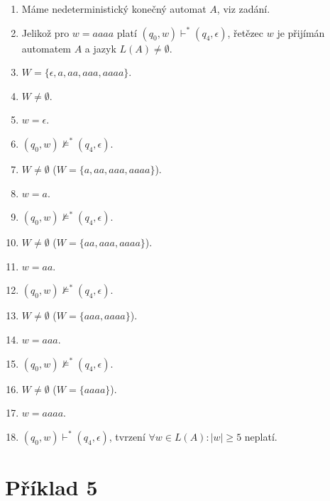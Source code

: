 \documentclass[11pt, a4paper, titlepage]{article}
\begin{document}
\begin{multicols}{2}
    \begin{enumerate}

        \item Máme nedeterministický konečný automat $A$, viz zadání.
        \item Jelikož pro $w=aaaa$ platí $(q_0, w) \vdash^* (q_4, \epsilon)$, řetězec $w$ je přijímán automatem $A$ a jazyk $L(A) \neq \emptyset$.
        \item $W=\{\epsilon, a, aa, aaa, aaaa\}$.

        \item $W \neq \emptyset$.
        \item $w=\epsilon$.
        \item $(q_0, w) \nvDash^* (q_4, \epsilon)$.

        \item $W \neq \emptyset$ ($W=\{a, aa, aaa, aaaa\}$).
        \item $w=a$.
        \item $(q_0, w) \nvDash^* (q_4, \epsilon)$.

        \item $W \neq \emptyset$ ($W=\{aa, aaa, aaaa\}$).
        \item $w=aa$.
        \item $(q_0, w) \nvDash^* (q_4, \epsilon)$.

        \item $W \neq \emptyset$ ($W=\{aaa, aaaa\}$).
        \item $w=aaa$.
        \item $(q_0, w) \nvDash^* (q_4, \epsilon)$.

        \item $W \neq \emptyset$ ($W=\{aaaa\}$).
        \item $w=aaaa$.
        \item $(q_0, w) \vdash^* (q_4, \epsilon)$, tvrzení $\forall w \in L(A) : |w| \ge 5$ neplatí.

    \end{enumerate}
\end{multicols}

\newpage


\section*{Příklad 5}
\end{document}
